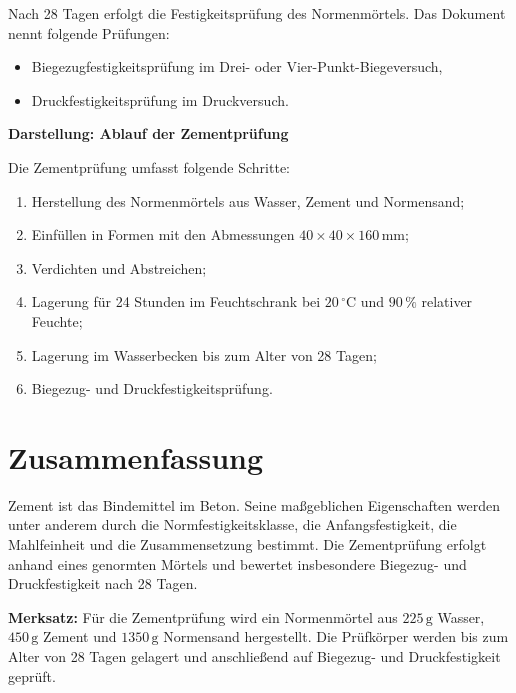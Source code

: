 \documentclass[
  12pt,
  a4paper,
  oneside
]{scrreprt}
\begin{document}
Nach 28 Tagen erfolgt die Festigkeitsprüfung des Normenmörtels. Das
Dokument nennt folgende Prüfungen:

\begin{itemize}
  \item Biegezugfestigkeitsprüfung im Drei- oder
  Vier-Punkt-Biegeversuch,
  \item Druckfestigkeitsprüfung im Druckversuch.
\end{itemize}



\begin{darstellungsbox}
\textbf{Darstellung: Ablauf der Zementprüfung}

Die Zementprüfung umfasst folgende Schritte:

\begin{enumerate}
  \item Herstellung des Normenmörtels aus Wasser, Zement und
  Normensand;
  \item Einfüllen in Formen mit den Abmessungen
  $40 \times 40 \times 160\,\mathrm{mm}$;
  \item Verdichten und Abstreichen;
  \item Lagerung für 24 Stunden im Feuchtschrank bei
  $20\,^\circ\mathrm{C}$ und $90\,\%$ relativer Feuchte;
  \item Lagerung im Wasserbecken bis zum Alter von 28 Tagen;
  \item Biegezug- und Druckfestigkeitsprüfung.
\end{enumerate}
\end{darstellungsbox}

\section{Zusammenfassung}

Zement ist das Bindemittel im Beton. Seine maßgeblichen Eigenschaften
werden unter anderem durch die Normfestigkeitsklasse, die
Anfangsfestigkeit, die Mahlfeinheit und die Zusammensetzung bestimmt.
Die Zementprüfung erfolgt anhand eines genormten Mörtels und bewertet
insbesondere Biegezug- und Druckfestigkeit nach 28 Tagen.


\begin{merksatzbox}
\textbf{Merksatz:}
Für die Zementprüfung wird ein Normenmörtel aus $225\,\mathrm{g}$
Wasser, $450\,\mathrm{g}$ Zement und $1350\,\mathrm{g}$ Normensand
hergestellt. Die Prüfkörper werden bis zum Alter von 28 Tagen gelagert
und anschließend auf Biegezug- und Druckfestigkeit geprüft.

\end{merksatzbox}
\end{document}

